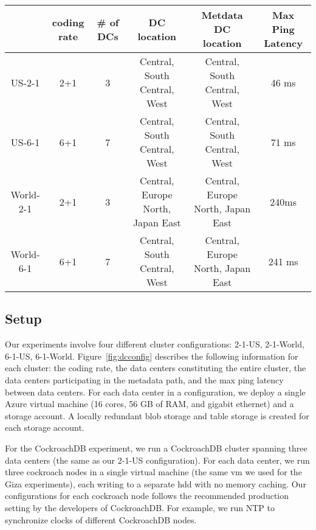 \begin{figure*}
\begin{tabular}{c|c|c|c|c|c}
& coding rate & \# of DCs & DC location & Metdata DC location & Max Ping Latency\\
\hline
US-2-1 & 2+1 & 3 & Central, South Central, West & Central, South Central, West & 46 ms \\
US-6-1 & 6+1 & 7 & Central, South Central, West & Central, South Central, West & 71 ms\\ 
World-2-1 & 2+1 & 3 & Central, Europe North, Japan East & Central, Europe North, Japan East & 240ms\\
World-6-1 & 6+1 & 7 & Central, South Central, West & Central, Europe North, Japan East & 241 ms\\
\end{tabular}
\caption{The DC configurations and inter-DC latencies in various experiments~\label{fig:dcconfig}} 
\end{figure*}

\subsection{Setup}
Our experiments involve four different cluster configurations: 2-1-US, 2-1-World, 6-1-US, 6-1-World. Figure~\ref{fig:dcconfig} describes the following information for each cluster: the coding rate, the data centers constituting the entire cluster, the data centers participating in the metadata path, and the max ping latency between data centers. For each data center in a configuration, we deploy a single Azure virtual machine (16 cores, 56 GB of RAM, and gigabit ethernet) and a storage account. A locally redundant blob storage and table storage is created for each storage account.

For the CockroachDB experiment, we run a CockroachDB cluster spanning three data centers (the same as our 2-1-US configuration). For each data center, we run three cockroach nodes in a single virtual machine (the same vm we used for the Giza experiments), each writing to a separate hdd with no memory caching. Our configurations for each cockroach node follows the recommended production setting by the developers of CockroachDB. For example, we run NTP to synchronize clocks of different CockroachDB nodes.

